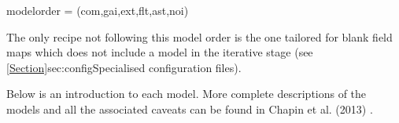 \documentclass[11pt,oneside,chapters]{starlink}
\begin{document}
\begin{terminalv}
modelorder = (com,gai,ext,flt,ast,noi)
\end{terminalv}


The only recipe not following this model order is the one tailored for
blank field maps which does not include a  model in the
iterative stage (see \cref{Section}{sec:config}{Specialised
configuration files}).

Below is an introduction to each model. More complete descriptions of the
models and all the associated caveats can be found in Chapin et al.
(2013) \cite{mapmaker}.

\end{document}
